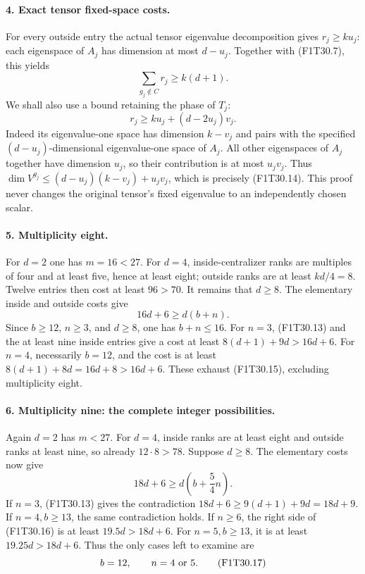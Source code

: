 \paragraph{4. Exact tensor fixed-space costs.}
For every outside entry the actual tensor eigenvalue
decomposition gives \(r_j\ge ku_j\): each eigenspace
of \(A_j\) has dimension at most \(d-u_j\).
Together with (F1T30.7), this yields
\[
                    \sum_{g_j\notin C}r_j\ge k(d+1).
 \tag{F1T30.13}
\]
We shall also use a bound retaining the phase of \(T_j\):
\[
           r_j\ge ku_j+(d-2u_j)v_j.
 \tag{F1T30.14}
\]
Indeed its eigenvalue-one space has dimension \(k-v_j\)
and pairs with the specified \((d-u_j)\)-dimensional
eigenvalue-one space of \(A_j\).
All other eigenspaces of \(A_j\) together have dimension
\(u_j\), so their contribution is at most \(u_jv_j\).
Thus
\(\dim V^{g_j}\le(d-u_j)(k-v_j)+u_jv_j\),
which is precisely (F1T30.14).
This proof never changes the original tensor's fixed
eigenvalue to an independently chosen scalar.

\paragraph{5. Multiplicity eight.}
For \(d=2\) one has \(m=16<27\).
For \(d=4\), inside-centralizer ranks are multiples
of four and at least five, hence at least eight;
outside ranks are at least \(kd/4=8\).
Twelve entries then cost at least \(96>70\).
It remains that \(d\ge8\).
The elementary inside and outside costs give
\[
                   16d+6\ge d(b+n).
 \tag{F1T30.15}
\]
Since \(b\ge12\), \(n\ge3\), and \(d\ge8\), one has
\(b+n\le16\). For \(n=3\), (F1T30.13) and the at
least nine inside entries give a cost at least
\(8(d+1)+9d>16d+6\).
For \(n=4\), necessarily \(b=12\), and the cost is
at least \(8(d+1)+8d=16d+8>16d+6\).
These exhaust (F1T30.15), excluding multiplicity eight.

\paragraph{6. Multiplicity nine: the complete integer possibilities.}
Again \(d=2\) has \(m<27\). For \(d=4\), inside
ranks are at least eight and outside ranks at least
nine, so already \(12\cdot8>78\).
Suppose \(d\ge8\).
The elementary costs now give
\[
                 18d+6\ge d\left(b+\frac54n\right).
 \tag{F1T30.16}
\]
If \(n=3\), (F1T30.13) gives the contradiction
\(18d+6\ge9(d+1)+9d=18d+9\).
If \(n=4,b\ge13\), the same contradiction holds.
If \(n\ge6\), the right side of (F1T30.16) is at
least \(19.5d>18d+6\).
For \(n=5,b\ge13\), it is at least
\(19.25d>18d+6\).
Thus the only cases left to examine are
\[
                           b=12,\qquad n=4\ \hbox{or}\ 5.
 \tag{F1T30.17}
\]

